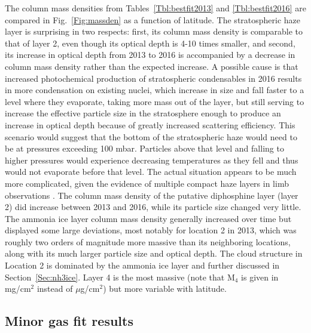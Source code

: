 \documentclass[article,11pt]{emulateapj}
\begin{document}
The column mass densities from Tables\ \ref{Tbl:bestfit2013}
 and \ref{Tbl:bestfit2016} are compared in Fig.\ \ref{Fig:massden} as a function
of latitude.    
The stratospheric haze layer is surprising in
two respects: first, its column mass density is comparable to that of layer 2, even
though its optical depth is 4-10 times smaller, and second,
its increase in optical depth from 2013 to 2016 is accompanied by a
decrease in column mass density rather than the expected increase.
 A possible cause is that increased
photochemical production of stratospheric condensables in 2016 results
in more condensation on existing nuclei, which increase in size and
fall faster to a level where they evaporate, taking more mass out of
the layer, but still serving to increase the effective particle size in the
stratosphere enough to produce an increase in optical depth because of
greatly increased scattering efficiency.  This scenario would suggest
that the bottom of the stratospheric haze would need to be at
pressures exceeding 100 mbar.  Particles above that level and falling to higher pressures
would experience decreasing temperatures as they fell and thus would
not evaporate before that level. The actual situation appears to be
much more complicated, given the evidence of multiple compact haze
layers in limb observations \citep{Sanchez-Lavega2020hazes}.
The column mass density of the putative diphosphine layer (layer 2) did increase
between 2013 and 2016, while its particle size changed very little.  The
ammonia ice layer column mass density generally increased over time but
displayed some large deviations, most notably for location 2 in 2013, which
was roughly two orders of magnitude more massive than its neighboring locations, 
along with its much larger particle size and optical depth. The cloud structure
in Location 2 is dominated by the ammonia ice layer and further discussed
in Section\ \ref{Sec:nh3ice}.  Layer 4 is the
most massive (note that M$_4$ is given in mg/cm$^2$ instead of $\mu$g/cm$^2$) but more variable
with latitude. 



\subsection{Minor gas fit results}
\end{document}
